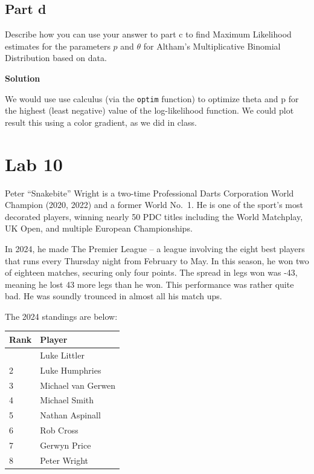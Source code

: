 \documentclass[
]{article}
\begin{document}
\normalsize

\subsection{Part d}\label{part-d}

Describe how you can use your answer to part c to find Maximum
Likelihood estimates for the parameters \(p\) and \(\theta\) for
Altham's Multiplicative Binomial Distribution based on data.

\textbf{Solution}

We would use use calculus (via the \texttt{optim} function) to optimize
theta and p for the highest (least negative) value of the log-likelihood
function. We could plot result this using a color gradient, as we did in
class.

\section{Lab 10}\label{lab-10}

Peter ``Snakebite'' Wright is a two-time Professional Darts Corporation
World Champion (2020, 2022) and a former World No.~1. He is one of the
sport's most decorated players, winning nearly 50 PDC titles including
the World Matchplay, UK Open, and multiple European Championships.

In 2024, he made The Premier League -- a league involving the eight best
players that runs every Thursday night from February to May. In this
season, he won two of eighteen matches, securing only four points. The
spread in legs won was -43, meaning he lost 43 more legs than he won.
This performance was rather quite bad. He was soundly trounced in almost
all his match ups.

The 2024 standings are below:

\begin{longtable}[]{@{}ll@{}}
\toprule\noalign{}
Rank & Player \\
\midrule\noalign{}
\endhead
\bottomrule\noalign{}
\endlastfoot
1 & Luke Littler \\
2 & Luke Humphries \\
3 & Michael van Gerwen \\
4 & Michael Smith \\
5 & Nathan Aspinall \\
6 & Rob Cross \\
7 & Gerwyn Price \\
8 & Peter Wright \\
\end{longtable}
\end{document}
